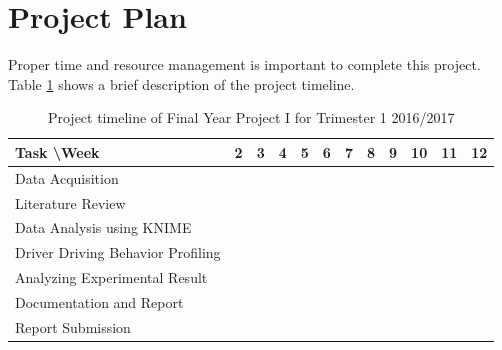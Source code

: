 \section{Project Plan}
Proper time and resource management is important to complete this project. Table \ref{tbl:gantt1} shows a brief description of the project timeline.

\begin{table}[h!]
\begin{tabular}{|l|c|c|c|c|c|c|c|c|c|c|c|}
\hline
Task \textbackslash Week & 2 & 3 & 4 & 5 & 6 & 7 & 8 & 9 & 10 & 11 & 12 \\

\hline
Data Acquisition &  \cellcolor[HTML]{000000} & \cellcolor[HTML]{000000} & \cellcolor[HTML]{000000} & \cellcolor[HTML]{000000} & \cellcolor[HTML]{000000} & & & & & & \\

\hline
Literature Review & & \cellcolor[HTML]{000000} & \cellcolor[HTML]{000000} & \cellcolor[HTML]{000000} & \cellcolor[HTML]{000000} & & & & & & \\

\hline
Data Analysis using KNIME & & & & & & \cellcolor[HTML]{000000} & \cellcolor[HTML]{000000} & \cellcolor[HTML]{000000} & & & \\

\hline
Driver Driving Behavior Profiling & & & & & & & & \cellcolor[HTML]{000000} & \cellcolor[HTML]{000000} &  & \\

\hline
Analyzing Experimental Result & & & & & & & & & \cellcolor[HTML]{000000} & \cellcolor[HTML]{000000} & \\

\hline
Documentation and Report & & & & & & & & & \cellcolor[HTML]{000000} & \cellcolor[HTML]{000000} & \cellcolor[HTML]{000000} \\

\hline
Report Submission & & & & & & & & & & & \cellcolor[HTML]{000000}\\

\hline
\end{tabular}
\label{tbl:gantt1}
\caption{Project timeline of Final Year Project I for Trimester 1 2016/2017}
\end{table}